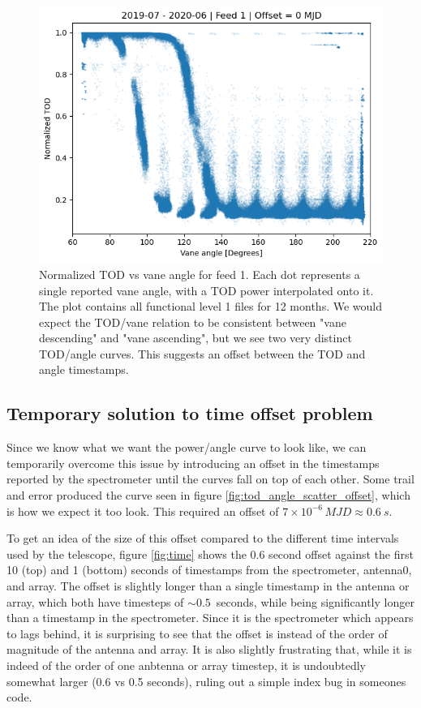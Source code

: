 \documentclass[10pt, a4paper]{article}
\begin{document}
\begin{figure}[H]
    \centering
    \includegraphics[scale=0.6]{../plots/power_angle_all_0.png}
    \caption{Normalized TOD vs vane angle for feed 1. Each dot represents a single reported vane angle, with a TOD power interpolated onto it. The plot contains all functional level 1 files for 12 months. We would expect the TOD/vane relation to be consistent between "vane descending" and "vane ascending", but we see two very distinct TOD/angle curves. This suggests an offset between the TOD and angle timestamps.}
    \label{fig:tod_angle_scatter}
\end{figure}



\subsection{Temporary solution to time offset problem}
Since we know what we want the power/angle curve to look like, we can temporarily overcome this issue by introducing an offset in the timestamps reported by the spectrometer until the curves fall on top of each other. Some trail and error produced the curve seen in figure \ref{fig:tod_angle_scatter_offset}, which is how we expect it too look. This required an offset of $7\times 10^{-6}\,\si{MJD} \approx \SI{0.6}{s}$.

To get an idea of the size of this offset compared to the different time intervals used by the telescope, figure \ref{fig:time} shows the 0.6 second offset against the first 10 (top) and 1 (bottom) seconds of timestamps from the spectrometer, antenna0, and array. The offset is slightly longer than a single timestamp in the antenna or array, which both have timesteps of $\sim 0.5$ seconds, while being significantly longer than a timestamp in the spectrometer. Since it is the spectrometer which appears to lags behind, it is surprising to see that the offset is instead of the order of magnitude of the antenna and array. It is also slightly frustrating that, while it is indeed of the order of one anbtenna or array timestep, it is undoubtedly somewhat larger (0.6 vs 0.5 seconds), ruling out a simple index bug in someones code.
\end{document}
